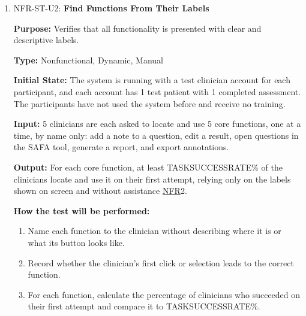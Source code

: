 \documentclass[12pt, titlepage]{article}
\newcommand{\srsnfr}[1]{\href{https://github.com/Nour-Fawaz/MacaBoca/blob/main/pdfs/SRS/SRS.pdf}{NFR}}
\renewcommand{\_}{\oldunderscore\allowbreak}
\begin{document}
\begin{enumerate}
  \item NFR-ST-U2: \textbf{Find Functions From Their Labels\\}
  \begin{mdframed}[linewidth=0.5mm]
      \textbf{Purpose:} Verifies that all functionality is presented with clear and descriptive labels. \par
      \textbf{Type:} Nonfunctional, Dynamic, Manual \par
      \textbf{Initial State:} The system is running with a test clinician account for each participant, and each account has 1 test patient with 1 completed assessment. The participants have not used the system before and receive no training. \par
      \textbf{Input:} 5 clinicians are each asked to locate and use 5 core functions, one at a time, by name only: add a note to a question, edit a result, open questions in the SAFA tool, generate a report, and export annotations. \par
      \textbf{Output:} For each core function, at least TASK\_SUCCESS\_RATE\% of the clinicians locate and use it on their first attempt, relying only on the labels shown on screen and without assistance \srsnfr*{2}. \par
      \textbf{How the test will be performed:}
      \begin{enumerate}
        \item[1.] Name each function to the clinician without describing where it is or what its button looks like.
        \item[2.] Record whether the clinician's first click or selection leads to the correct function.
        \item[3.] For each function, calculate the percentage of clinicians who succeeded on their first attempt and compare it to TASK\_SUCCESS\_RATE\%.
      \end{enumerate}
  \end{mdframed}


\end{enumerate}
\end{document}
